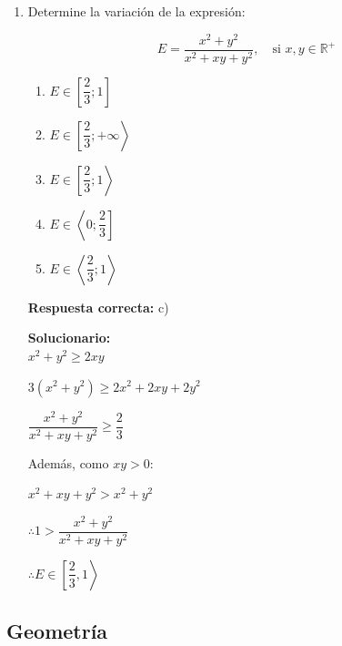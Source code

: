 \begin{enumerate}
	\item Determine la variación de la expresión:
	
	$$E=\dfrac{x^2+y^2}{x^2+xy+y^2}, \quad \text{si } x,y\in \mathbb{R}^{+}$$
	
	\begin{enumerate}[label=\alph*)]
		\item $E\in \left[\dfrac{2}{3};1\right]$
		\item $E\in \left[\dfrac{2}{3};+\infty\right\rangle$
		\item $E\in \left[\dfrac{2}{3};1\right\rangle$
		\item $E\in \left\langle 0;\dfrac{2}{3}\right]$
		\item $E\in \left\langle \dfrac{2}{3};1\right\rangle$
	\end{enumerate}
	\textbf{Respuesta correcta:} c)
	
	\vspace{2mm}
	\textbf{Solucionario:}\\
	
	$x^2+y^2\geq 2xy$
	
	$3(x^2+y^2)\geq 2x^2+2xy+2y^2$
	
	$\dfrac{x^2+y^2}{x^2+xy+y^2}\geq \dfrac{2}{3}$
	
	Además, como $xy>0$:
	
	$x^2+xy+y^2>x^2+y^2$
	
	$\therefore 1>\dfrac{x^2+y^2}{x^2+xy+y^2}$
	
	$\therefore E\in \left[\dfrac{2}{3},1\right\rangle$
	
	\fbox{$E\in \left[\dfrac{2}{3},1\right\rangle$}
	
	\vspace{6mm}
	
\end{enumerate}





\subsection*{Geometría}


